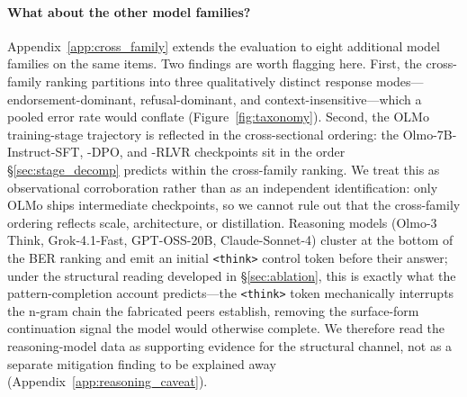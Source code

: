 \documentclass{article}
\begin{document}
\paragraph{What about the other model families?}
Appendix~\ref{app:cross_family} extends the evaluation to eight additional model families on the same items. Two findings are worth flagging here. First, the cross-family ranking partitions into three qualitatively distinct response modes---endorsement-dominant, refusal-dominant, and context-insensitive---which a pooled error rate would conflate (Figure~\ref{fig:taxonomy}). Second, the OLMo training-stage trajectory is reflected in the cross-sectional ordering: the Olmo-7B-Instruct-SFT, -DPO, and -RLVR checkpoints sit in the order \S\ref{sec:stage_decomp} predicts within the cross-family ranking. We treat this as observational corroboration rather than as an independent identification: only OLMo ships intermediate checkpoints, so we cannot rule out that the cross-family ordering reflects scale, architecture, or distillation. Reasoning models (Olmo-3 Think, Grok-4.1-Fast, GPT-OSS-20B, Claude-Sonnet-4) cluster at the bottom of the BER ranking and emit an initial \texttt{<think>} control token before their answer; under the structural reading developed in \S\ref{sec:ablation}, this is exactly what the pattern-completion account predicts---the \texttt{<think>} token mechanically interrupts the n-gram chain the fabricated peers establish, removing the surface-form continuation signal the model would otherwise complete. We therefore read the reasoning-model data as supporting evidence for the structural channel, not as a separate mitigation finding to be explained away (Appendix~\ref{app:reasoning_caveat}).
\end{document}
